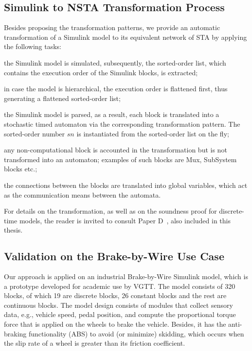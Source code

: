 \subsection*{Simulink to NSTA Transformation Process} 
Besides proposing the transformation patterns, we provide an automatic transformation of a Simulink model to its equivalent network of STA by applying the following tasks:
\begin{enumerate*}[label=(\roman*)]
	\item the Simulink model is simulated, subsequently, the sorted-order list, which contains the execution order of the Simulink blocks, is extracted;
	\item in case the model is hierarchical, the execution order is flattened first, thus generating a flattened sorted-order list;
	\item the Simulink model is parsed, as a result, each block is translated into a stochastic timed automaton via the corresponding transformation pattern. The sorted-order number $sn$ is instantiated from the sorted-order list on the fly;
	\item any non-computational block is accounted in the transformation but is not transformed into an automaton; examples of such blocks are Mux, SubSystem blocks etc.;
	\item the connections between the blocks are translated into global variables, which act as the communication means between the automata.
\end{enumerate*}
For details on the transformation, as well as on the soundness proof for discrete-time models, the reader is invited to consult Paper D~\cite{Filipovikj2018SimppaalModels}, also included in this thesis. 


\subsection*{Validation on the Brake-by-Wire Use Case} 
Our approach is applied on an industrial Brake-by-Wire Simulink model, which is a prototype developed for academic use by VGTT. The model consists of 320 blocks, of which 19 are discrete blocks, 26 constant blocks and the rest are continuous blocks. The model design consists of modules that collect sensory data, e.g., vehicle speed, pedal position, and compute the proportional torque force that is applied on the wheels to brake the vehicle. Besides, it has the  anti-braking functionality (ABS) to avoid (or minimize) skidding, which occurs when the slip rate of a wheel is greater than its friction coefficient. 

